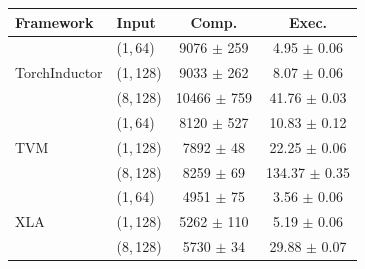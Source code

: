 \begin{tabular}{llcc}
\toprule
\textbf{Framework} & \textbf{Input} & \textbf{Comp.} & \textbf{Exec.} \\
\midrule
\multirow{3}{*}{TorchInductor}
& (1,\,64) & 9076 $\pm$ 259 & 4.95 $\pm$ 0.06 \\
& (1,\,128) & 9033 $\pm$ 262 & 8.07 $\pm$ 0.06 \\
& (8,\,128) & 10466 $\pm$ 759 & 41.76 $\pm$ 0.03 \\
\midrule
\multirow{3}{*}{TVM}
& (1,\,64) & 8120 $\pm$ 527 & 10.83 $\pm$ 0.12 \\
& (1,\,128) & 7892 $\pm$ 48 & 22.25 $\pm$ 0.06 \\
& (8,\,128) & 8259 $\pm$ 69 & 134.37 $\pm$ 0.35 \\
\midrule
\multirow{3}{*}{XLA}
& (1,\,64) & 4951 $\pm$ 75 & 3.56 $\pm$ 0.06 \\
& (1,\,128) & 5262 $\pm$ 110 & 5.19 $\pm$ 0.06 \\
& (8,\,128) & 5730 $\pm$ 34 & 29.88 $\pm$ 0.07 \\
\bottomrule
\end{tabular}

